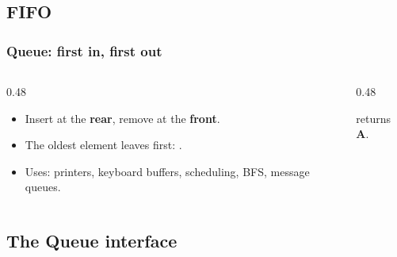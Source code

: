 \documentclass[aspectratio=169,10pt, compress]{beamer}
\begin{document}

\subsection[Concept]{FIFO}




\begin{frame}[t,fragile] \frametitle{Queue: first in, first out}
  \begin{columns}[T]
    \begin{column}{0.48\textwidth}
      \begin{itemize}
        \item Insert at the \textbf{rear}, remove at the \textbf{front}.
        \item The oldest element leaves first: .
        \item Uses: printers, keyboard buffers, scheduling, BFS,
              message queues.
      \end{itemize}
    \end{column}
    \begin{column}{0.48\textwidth}
      \begin{center}
      \end{center}
      \small {} returns \textbf{A}.
    \end{column}
  \end{columns}
\end{frame}

\subsection[Interface]{The Queue interface}
\end{document}
